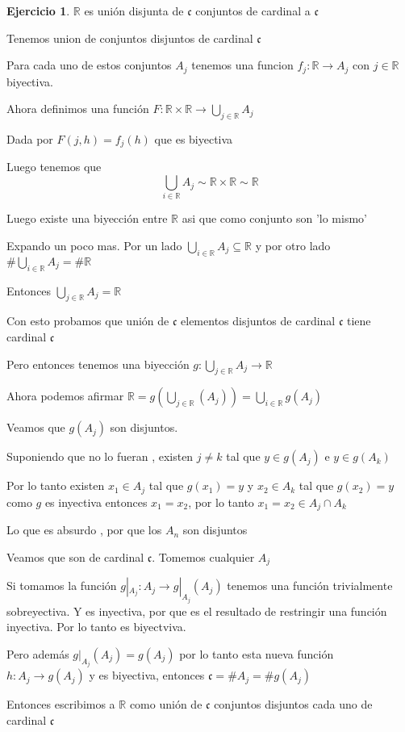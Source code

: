 \documentclass[12pt]{article}
\newcommand{\R}{\mathbb{R}}
\newcommand{\ra}{\rightarrow}
\theoremstyle{definition}
\newtheorem{ej}{Ejercicio}
\begin{document}
\begin{ej}
\noindent  $\R$ es unión disjunta de $\mathfrak{c}$ conjuntos de cardinal a $\mathfrak{c}$

Tenemos union de conjuntos disjuntos de cardinal $\mathfrak{c}$ 

Para cada uno de estos conjuntos $A_{j}$ tenemos una funcion $f_{j} : \R \ra A_{j}$ con $j \in \R$ biyectiva.

Ahora definimos una función $F: \R \times \R \ra \bigcup_{j \in \R} A_{j}$

Dada por $F(j,h) = f_{j}(h)$ que es biyectiva

Luego tenemos que $$\bigcup_{i \in \R} A_{j} \sim \R \times \R \sim \R  $$

Luego existe una biyección entre $\R $ asi que como conjunto son 'lo mismo'

Expando un poco mas. Por un lado $\bigcup_{i \in \R} A_j \subseteq \R$ y por otro lado $\# \bigcup_{i \in \R} A_j = \# \R$

Entonces $\bigcup_{j \in \R} A_j = \R$

Con esto probamos que unión de $\mathfrak{c}$ elementos disjuntos de cardinal $\mathfrak{c}$ tiene cardinal $\mathfrak{c}$

Pero entonces tenemos una biyección $g: \bigcup_{j \in \R} A_j \ra \R$

Ahora podemos afirmar $\R = g(\bigcup_{j \in \R} (A_j)) = \bigcup_{i \in \R} g(A_j)$

Veamos que $g(A_j)$ son disjuntos. 

Suponiendo que no lo fueran , existen $j\neq k$ tal que $y \in g(A_j)$ e $y \in g(A_k)$

Por lo tanto existen $x_1 \in A_j$ tal que $g(x_1) = y$ y $x_2 \in A_k$ tal que $g(x_2) = y$ como $g$ es inyectiva entonces $x_1 = x_2$, por lo tanto $x_1 = x_2 \in A_j \cap A_k$

Lo que es absurdo , por que los $A_n$ son disjuntos

Veamos que son de cardinal $\mathfrak{c}$. Tomemos cualquier $A_j$

Si tomamos la función $g|_{A_j}: A_j \ra g|_{A_j}(A_j)$ tenemos una función trivialmente sobreyectiva. Y es inyectiva, por que es el resultado de restringir una función inyectiva. Por lo tanto es biyectviva. 

Pero además $g|_{A_j} (A_j) = g(A_j)$ por lo tanto esta nueva función $h: A_j \ra g(A_j)$ y es biyectiva, entonces $\mathfrak{c} = \# A_j = \# g(A_j)$

Entonces escribimos a $\R$ como unión de $\mathfrak{c}$ conjuntos disjuntos cada uno de cardinal $\mathfrak{c}$
\end{ej}
\end{document}
